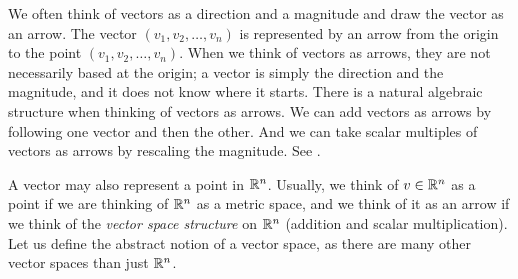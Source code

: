 We often think of vectors as a direction and a magnitude and draw the
vector as an arrow.  The vector $(v_1,v_2,\ldots,v_n)$ is represented
by an arrow from the origin to the point $(v_1,v_2,\ldots,v_n)$.
When we think of vectors as arrows, they are
not necessarily based at the origin; a vector is simply the direction and
the magnitude, and it does not know where it starts.
There is a natural algebraic structure when thinking of vectors as arrows.
We can add vectors as arrows by following one vector and then the other.
And we can take scalar multiples of vectors as arrows by rescaling
the magnitude.  See .
\begin{myfigureht}
\caption{Vector as an arrow in $\R^2$, and the meaning of addition and
scalar multiplication.\label{fig:vecasarrow}}
\end{myfigureht}

A vector may also represent a point in ${\mathbb{R}}^n$.
Usually, we think of $v \in {\mathbb{R}}^n$
as a point if we are thinking of ${\mathbb{R}}^n$ as a metric space, and we think of
it as an arrow if we think of the \emph{vector space structure} on
${\mathbb{R}}^n$ (addition and scalar multiplication).
Let us define the abstract notion of a vector space, as there
are many other vector spaces than just ${\mathbb{R}}^n$.

